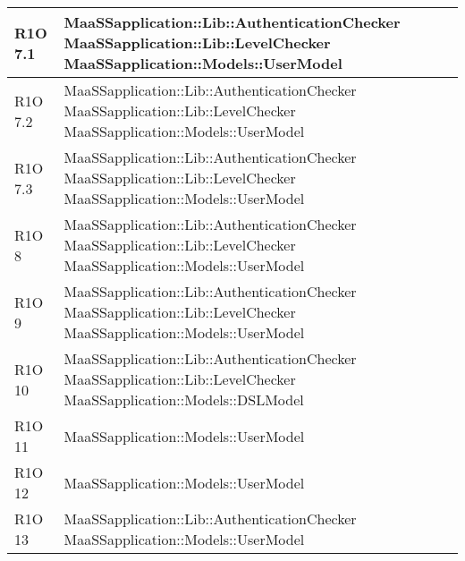 \begin{center}
\begin{longtable}{ | l | p{8cm} |}
	R1O 7.1 & MaaSSapplication::Lib::AuthenticationChecker \newline MaaSSapplication::Lib::LevelChecker \newline  MaaSSapplication::Models::UserModel  \newline  \\ \hline
	
	R1O 7.2 & MaaSSapplication::Lib::AuthenticationChecker \newline MaaSSapplication::Lib::LevelChecker \newline  MaaSSapplication::Models::UserModel  \newline  \\ \hline
	
	R1O 7.3 & MaaSSapplication::Lib::AuthenticationChecker \newline MaaSSapplication::Lib::LevelChecker \newline  MaaSSapplication::Models::UserModel  \newline  \\ \hline

	R1O 8 & MaaSSapplication::Lib::AuthenticationChecker \newline MaaSSapplication::Lib::LevelChecker \newline   MaaSSapplication::Models::UserModel \newline  \\ \hline
	
	R1O 9 & MaaSSapplication::Lib::AuthenticationChecker \newline MaaSSapplication::Lib::LevelChecker \newline   MaaSSapplication::Models::UserModel \newline  \\ \hline
	
    R1O 10 & MaaSSapplication::Lib::AuthenticationChecker \newline MaaSSapplication::Lib::LevelChecker \newline   MaaSSapplication::Models::DSLModel \newline  \\ \hline
    
    R1O 11 & MaaSSapplication::Models::UserModel \newline  \\ \hline
	
	R1O 12 & MaaSSapplication::Models::UserModel  \newline  \\ \hline
	
	R1O 13 & MaaSSapplication::Lib::AuthenticationChecker \newline  MaaSSapplication::Models::UserModel \newline  \\ \hline
	

\end{longtable}
\end{center}
